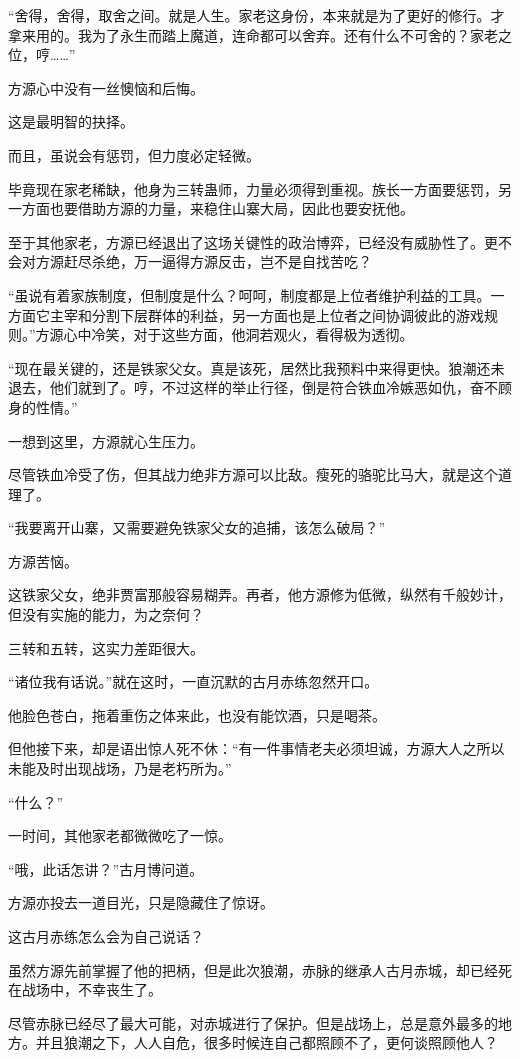 \begin{this_body}
“舍得，舍得，取舍之间。就是人生。家老这身份，本来就是为了更好的修行。才拿来用的。我为了永生而踏上魔道，连命都可以舍弃。还有什么不可舍的？家老之位，哼……”

方源心中没有一丝懊恼和后悔。

这是最明智的抉择。

而且，虽说会有惩罚，但力度必定轻微。

毕竟现在家老稀缺，他身为三转蛊师，力量必须得到重视。族长一方面要惩罚，另一方面也要借助方源的力量，来稳住山寨大局，因此也要安抚他。

至于其他家老，方源已经退出了这场关键性的政治博弈，已经没有威胁性了。更不会对方源赶尽杀绝，万一逼得方源反击，岂不是自找苦吃？

“虽说有着家族制度，但制度是什么？呵呵，制度都是上位者维护利益的工具。一方面它主宰和分割下层群体的利益，另一方面也是上位者之间协调彼此的游戏规则。”方源心中冷笑，对于这些方面，他洞若观火，看得极为透彻。

“现在最关键的，还是铁家父女。真是该死，居然比我预料中来得更快。狼潮还未退去，他们就到了。哼，不过这样的举止行径，倒是符合铁血冷嫉恶如仇，奋不顾身的性情。”

一想到这里，方源就心生压力。

尽管铁血冷受了伤，但其战力绝非方源可以比敌。瘦死的骆驼比马大，就是这个道理了。

“我要离开山寨，又需要避免铁家父女的追捕，该怎么破局？”

方源苦恼。

这铁家父女，绝非贾富那般容易糊弄。再者，他方源修为低微，纵然有千般妙计，但没有实施的能力，为之奈何？

三转和五转，这实力差距很大。

“诸位我有话说。”就在这时，一直沉默的古月赤练忽然开口。

他脸色苍白，拖着重伤之体来此，也没有能饮酒，只是喝茶。

但他接下来，却是语出惊人死不休：“有一件事情老夫必须坦诚，方源大人之所以未能及时出现战场，乃是老朽所为。”

“什么？”

一时间，其他家老都微微吃了一惊。

“哦，此话怎讲？”古月博问道。

方源亦投去一道目光，只是隐藏住了惊讶。

这古月赤练怎么会为自己说话？

虽然方源先前掌握了他的把柄，但是此次狼潮，赤脉的继承人古月赤城，却已经死在战场中，不幸丧生了。

尽管赤脉已经尽了最大可能，对赤城进行了保护。但是战场上，总是意外最多的地方。并且狼潮之下，人人自危，很多时候连自己都照顾不了，更何谈照顾他人？


\end{this_body}
